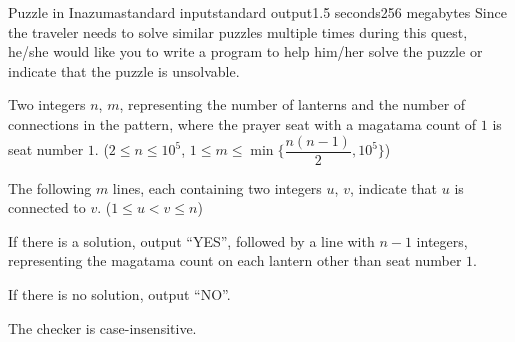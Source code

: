\begin{problem}{Puzzle in Inazuma}{standard input}{standard output}{1.5 seconds}{256 megabytes}
Since the traveler needs to solve similar puzzles multiple times during this quest, he/she would like you to write a program to help him/her solve the puzzle or indicate that the puzzle is unsolvable.

\InputFile
Two integers $n$, $m$, representing the number of lanterns and the number of connections in the pattern, where the prayer seat with a magatama count of $1$ is seat number $1$. ($2 \le n \le 10^5$, $1 \le m \le \min {\{\dfrac{n(n - 1)}{2}, 10^5\}}$)

The following $m$ lines, each containing two integers $u$, $v$, indicate that $u$ is connected to $v$. ($1 \le u < v \le n$)

\OutputFile
If there is a solution, output ``YES'', followed by a line with $n - 1$ integers, representing the magatama count on each lantern other than seat number $1$.

If there is no solution, output ``NO''.

The checker is case-insensitive.

\Examples

\begin{example}
%
%
%
\end{example}

\end{problem}

